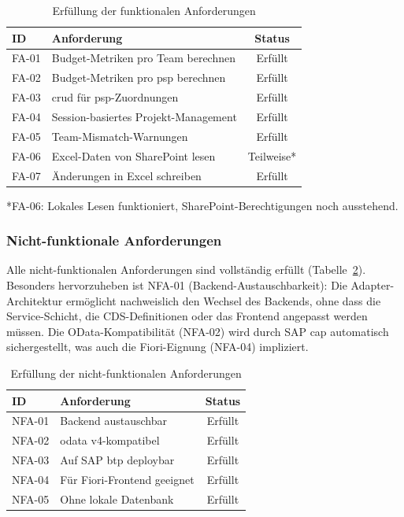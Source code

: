 \begin{table}[H]
\centering
\caption{Erfüllung der funktionalen Anforderungen}
\label{tab:fa-erfuellung}
\begin{tabularx}{\textwidth}{l>{\raggedright\arraybackslash}Xc}
\toprule
\textbf{ID} & \textbf{Anforderung} & \textbf{Status} \\
\midrule
FA-01 & Budget-Metriken pro Team berechnen & Erfüllt \\
FA-02 & Budget-Metriken pro \gls{psp} berechnen & Erfüllt \\
FA-03 & \gls{crud} für \gls{psp}-Zuordnungen & Erfüllt \\
FA-04 & Session-basiertes Projekt-Management & Erfüllt \\
FA-05 & Team-Mismatch-Warnungen & Erfüllt \\
FA-06 & Excel-Daten von SharePoint lesen & Teilweise* \\
FA-07 & Änderungen in Excel schreiben & Erfüllt \\
\bottomrule
\end{tabularx}
\end{table}

*FA-06: Lokales Lesen funktioniert, SharePoint-Berechtigungen noch ausstehend.

\subsubsection{Nicht-funktionale Anforderungen}

Alle nicht-funktionalen Anforderungen sind vollständig erfüllt (Tabelle~\ref{tab:nfa-erfuellung}). Besonders hervorzuheben ist NFA-01 (Backend-Austauschbarkeit): Die Adapter-Architektur ermöglicht nachweislich den Wechsel des Backends, ohne dass die Service-Schicht, die CDS-Definitionen oder das Frontend angepasst werden müssen. Die OData-Kompatibilität (NFA-02) wird durch SAP \gls{cap} automatisch sichergestellt, was auch die Fiori-Eignung (NFA-04) impliziert.

\begin{table}[H]
\centering
\caption{Erfüllung der nicht-funktionalen Anforderungen}
\label{tab:nfa-erfuellung}
\begin{tabularx}{\textwidth}{l>{\raggedright\arraybackslash}Xc}
\toprule
\textbf{ID} & \textbf{Anforderung} & \textbf{Status} \\
\midrule
NFA-01 & Backend austauschbar & Erfüllt \\
NFA-02 & \gls{odata} v4-kompatibel & Erfüllt \\
NFA-03 & Auf SAP \gls{btp} deploybar & Erfüllt \\
NFA-04 & Für Fiori-Frontend geeignet & Erfüllt \\
NFA-05 & Ohne lokale Datenbank & Erfüllt \\
\bottomrule
\end{tabularx}
\end{table}

